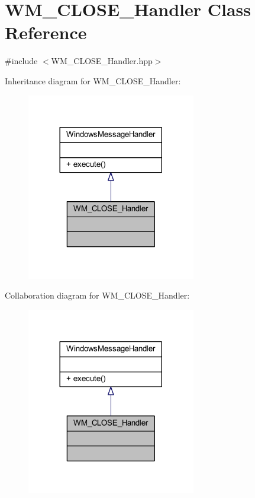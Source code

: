 \hypertarget{class_w_m___c_l_o_s_e___handler}{}\section{W\+M\+\_\+\+C\+L\+O\+S\+E\+\_\+\+Handler Class Reference}
\label{class_w_m___c_l_o_s_e___handler}


{\ttfamily \#include $<$W\+M\+\_\+\+C\+L\+O\+S\+E\+\_\+\+Handler.\+hpp$>$}



Inheritance diagram for W\+M\+\_\+\+C\+L\+O\+S\+E\+\_\+\+Handler\+:\nopagebreak
\begin{figure}[H]
\begin{center}
\leavevmode
\includegraphics[width=209pt]{class_w_m___c_l_o_s_e___handler__inherit__graph}
\end{center}
\end{figure}


Collaboration diagram for W\+M\+\_\+\+C\+L\+O\+S\+E\+\_\+\+Handler\+:\nopagebreak
\begin{figure}[H]
\begin{center}
\leavevmode
\includegraphics[width=209pt]{class_w_m___c_l_o_s_e___handler__coll__graph}
\end{center}
\end{figure}
